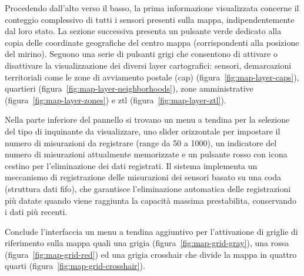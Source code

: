 Procedendo dall'alto verso il basso, la prima informazione visualizzata concerne il conteggio complessivo
di tutti i sensori presenti sulla mappa, indipendentemente dal loro stato.
La sezione successiva presenta un pulsante verde dedicato alla copia delle coordinate geografiche del centro mappa
(corrispondenti alla posizione del mirino). Seguono una serie di pulsanti grigi che consentono
di attivare o disattivare la visualizzazione dei diversi layer cartografici: sensori, demarcazioni territoriali
come le zone di avviamento postale (\acrshort{cap}) (figura~\ref{fig:map-layer-caps}),
quartieri (figura~\ref{fig:map-layer-neighborhoods}),
zone amministrative (figura~\ref{fig:map-layer-zones}) e \acrshort{ztl} (figura~\ref{fig:map-layer-ztl}).

Nella parte inferiore del pannello si trovano un menu a tendina per la selezione del tipo di inquinante da visualizzare,
uno slider orizzontale per impostare il numero di misurazioni da registrare (range da 50 a 1000),
un indicatore del numero di misurazioni attualmente memorizzate e un pulsante rosso con icona cestino per
l'eliminazione dei dati registrati. Il sistema implementa un meccanismo di registrazione delle misurazioni dei sensori
basato su una coda (struttura dati \acrshort{fifo}), che garantisce l'eliminazione automatica delle registrazioni
più datate quando viene raggiunta la capacità massima prestabilita, conservando i dati più recenti.

Conclude l'interfaccia un menu a tendina aggiuntivo per l'attivazione di griglie di riferimento sulla mappa
quali una grigia (figura~\ref{fig:map-grid-gray}), una rossa
(figura~\ref{fig:map-grid-red}) ed una grigia crosshair che divide la mappa
in quattro quarti (figura~\ref{fig:map-grid-crosshair}).

